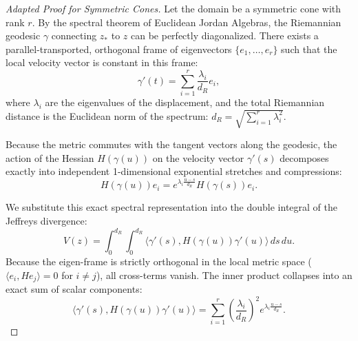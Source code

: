 \begin{proof}[Adapted Proof for Symmetric Cones]
Let the domain be a symmetric cone with rank $r$. By the spectral theorem of Euclidean Jordan Algebras, the Riemannian geodesic $\gamma$ connecting $z_*$ to $z$ can be perfectly diagonalized. There exists a parallel-transported, orthogonal frame of eigenvectors $\{e_1, \dots, e_r\}$ such that the local velocity vector is constant in this frame:
\begin{equation}
    \gamma'(t) = \sum_{i=1}^r \frac{\lambda_i}{d_R} e_i,
\end{equation}
where $\lambda_i$ are the eigenvalues of the displacement, and the total Riemannian distance is the Euclidean norm of the spectrum: $d_R = \sqrt{\sum_{i=1}^r \lambda_i^2}$.

Because the metric commutes with the tangent vectors along the geodesic, the action of the Hessian $H(\gamma(u))$ on the velocity vector $\gamma'(s)$ decomposes exactly into independent 1-dimensional exponential stretches and compressions:
\begin{equation}
    H(\gamma(u)) e_i = e^{\lambda_i \frac{u-s}{d_R}} H(\gamma(s)) e_i.
\end{equation}

We substitute this exact spectral representation into the double integral of the Jeffreys divergence:
\begin{equation}
    V(z) = \int_0^{d_R} \int_0^{d_R} \langle \gamma'(s), H(\gamma(u)) \gamma'(u) \rangle \, ds \, du.
\end{equation}
Because the eigen-frame is strictly orthogonal in the local metric space ($\langle e_i, H e_j \rangle = 0$ for $i \neq j$), all cross-terms vanish. The inner product collapses into an exact sum of scalar components:
\begin{equation}
    \langle \gamma'(s), H(\gamma(u)) \gamma'(u) \rangle = \sum_{i=1}^r \left( \frac{\lambda_i}{d_R} \right)^2 e^{\lambda_i \frac{u-s}{d_R}}.
\end{equation}


\end{proof}
